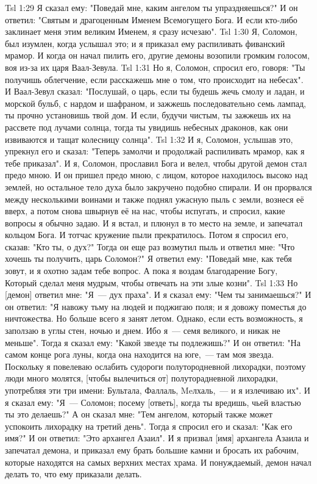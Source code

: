 \vs Tsl 1:29 
Я сказал ему: "Поведай мне, каким ангелом ты упраздняешься?" И он ответил: "Святым и драгоценным Именем Всемогущего Бога. И если кто-либо заклинает меня этим великим Именем, я сразу исчезаю".
\vs Tsl 1:30 
Я, Соломон, был изумлен, когда услышал это; и я приказал ему распиливать фиванский мрамор. И когда он начал пилить его, другие демоны возопили громким голосом, воя из-за их царя Ваал-Зевула.
\vs Tsl 1:31 
Но я, Соломон, спросил его, говоря: "Ты получишь облегчение, если расскажешь мне о том, что происходит на небесах". И Ваал-Зевул сказал: "Послушай, о царь, если ты будешь жечь смолу и ладан, и морской бульб, с нардом и шафраном, и зажжешь последовательно семь лампад, ты прочно установишь твой дом. И если, будучи чистым, ты зажжешь их на рассвете под лучами солнца, тогда ты увидишь небесных драконов, как они извиваются и тащат колесницу солнца".
\vs Tsl 1:32 
И я, Соломон, услышав это, упрекнул его и сказал: "Теперь замолчи и продолжай распиливать мрамор, как я тебе приказал". И я, Соломон, прославил Бога и велел, чтобы другой демон стал предо мною. И он пришел предо мною, с лицом, которое находилось высоко над землей, но остальное тело духа было закручено подобно спирали. И он прорвался между несколькими воинами и также поднял ужасную пыль с земли, вознеся её вверх, а потом снова швырнув её на нас, чтобы испугать, и спросил, какие вопросы я обычно задаю. И я встал, и плюнул в то место на земле, и запечатал кольцом Бога. И тотчас кружение пыли прекратилось. Потом я спросил его, сказав: "Кто ты, о дух?" Тогда он еще раз возмутил пыль и ответил мне: "Что хочешь ты получить, царь Соломон?" Я ответил ему: "Поведай мне, как тебя зовут, и я охотно задам тебе вопрос. А пока я воздам благодарение Богу, Который сделал меня мудрым, чтобы отвечать на эти злые козни".
\vs Tsl 1:33 
Но [демон] ответил мне: "Я~--- дух праха". И я сказал ему: "Чем ты занимаешься?" И он ответил: "Я навожу тьму на людей и поджигаю поля; и я довожу поместья до ничтожества. Но больше всего я занят летом. Однако, если есть возможность, я заползаю в углы стен, ночью и днем. Ибо я~--- семя великого, и никак не меньше". Тогда я сказал ему: "Какой звезде ты подлежишь?" И он ответил: "На самом конце рога луны, когда она находится на юге,~--- там моя звезда. Поскольку я повелеваю ослабить судороги полутородневной лихорадки, поэтому люди много молятся, [чтобы вылечиться от] полуторадневной лихорадки, употребляя эти три имени: Бультала, Фаллаль, Meлхаль,~--- и я излечиваю их". И я сказал ему: "Я~--- Соломон; посему [ответь], когда ты вредишь, чьей властью ты это делаешь?" А он сказал мне: "Тем ангелом, который также может успокоить лихорадку на третий день". Тогда я спросил его и сказал: "Как его имя?" И он ответил: "Это архангел Азаил". И я призвал [имя] архангела Азаила и запечатал демона, и приказал ему брать большие камни и бросать их рабочим, которые находятся на самых верхних местах храма. И понуждаемый, демон начал делать то, что ему приказали делать.
